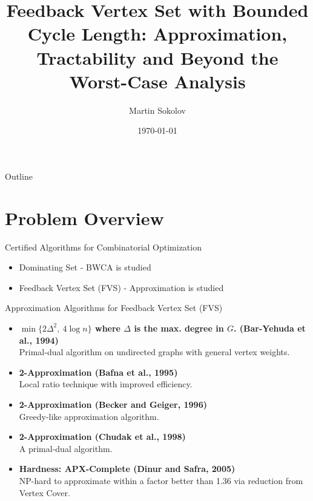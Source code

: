 \documentclass{beamer}
\title{Feedback Vertex Set with Bounded Cycle Length: Approximation, Tractability and Beyond the Worst-Case Analysis}
\author{Martin Sokolov}
\institute{Utrecht University}
\date{\today}
\begin{document}
\begin{frame}
  \titlepage
\end{frame}

\begin{frame}{Outline}
  \tableofcontents
\end{frame}

\section{Problem Overview}

\begin{frame}{Certified Algorithms for Combinatorial Optimization}

\begin{itemize}
    \item Dominating Set - BWCA is studied
    \item \textcolor{red!50}{Feedback Vertex Set (FVS)} - Approximation is studied
\end{itemize}

\end{frame}

\begin{frame}{Approximation Algorithms for Feedback Vertex Set (FVS)}

\begin{itemize}
    \item \textbf{$\min\{2\Delta^2,\ 4 \log n\}$ where $\Delta$ is the max. degree in $G$. (Bar-Yehuda et al., 1994)}\\
    \small Primal-dual algorithm on undirected graphs with general vertex weights.

    \item \textbf{2-Approximation (Bafna et al., 1995)}\\
    \small Local ratio technique with improved efficiency.
    
    \item \textbf{2-Approximation (Becker and Geiger, 1996)}\\
    \small Greedy-like approximation algorithm.

    \item \textbf{2-Approximation (Chudak et al., 1998)}\\
    \small A primal-dual algorithm.
    
\end{itemize}

\begin{itemize}
  \item \textbf{Hardness: APX-Complete (Dinur and Safra, 2005)}\\
    \small NP-hard to approximate within a factor better than 1.36 via reduction from Vertex Cover.
\end{itemize}

\end{frame}
\end{document}
